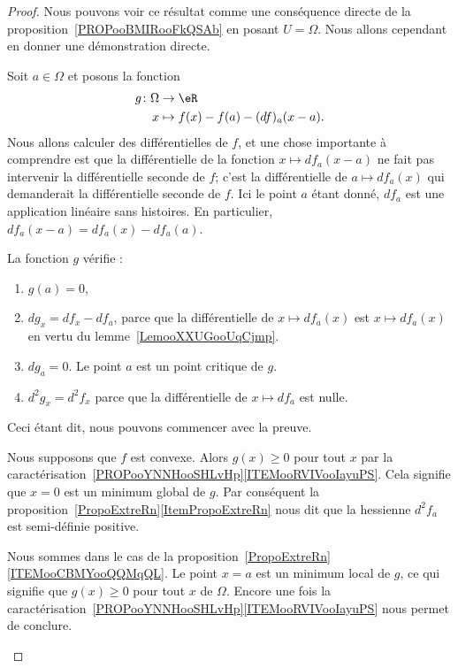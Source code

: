 \begin{proof}
	Nous pouvons voir ce résultat comme une conséquence directe de la proposition~\ref{PROPooBMIRooFkQSAb} en posant \( U=\Omega\). Nous allons cependant en donner une démonstration directe.

	Soit \( a\in \Omega\) et posons la fonction
	\begin{equation}
		\begin{aligned}
			g\colon \Omega & \to \eR                        \\
			x              & \mapsto f(x)-f(a)-(df)_a(x-a).
		\end{aligned}
	\end{equation}
	Nous allons calculer des différentielles de \( f\), et une chose importante à comprendre est que la différentielle de la fonction \( x\mapsto df_a(x-a)\) ne fait pas intervenir la différentielle seconde de \( f\); c'est la différentielle de \( a\mapsto df_a(x)\) qui demanderait la différentielle seconde de \( f\). Ici le point \( a\) étant donné, \( df_a\) est une application linéaire sans histoires. En particulier, \( df_a(x-a)=df_a(x)-df_a(a)\).

	La fonction \( g\) vérifie :
	\begin{enumerate}
		\item
		      \( g(a)=0\),
		\item
		      \( dg_x=df_x-df_a\), parce que la différentielle de \( x\mapsto df_a(x)\) est \( x\mapsto df_a(x)\) en vertu du lemme~\ref{LemooXXUGooUqCjmp}.
		\item
		      \( dg_a=0\). Le point \( a\) est un point critique de \( g\).
		\item
		      \( d^2g_x=d^2f_x\) parce que la différentielle de \( x\mapsto df_a\) est nulle.
	\end{enumerate}
	Ceci étant dit, nous pouvons commencer avec la preuve.
	\begin{subproof}

		Nous supposons que \( f\) est convexe. Alors \( g(x)\geq 0\) pour tout \( x\) par la caractérisation~\ref{PROPooYNNHooSHLvHp}\ref{ITEMooRVIVooIayuPS}. Cela signifie que \( x=0\) est un minimum global de \( g\). Par conséquent la proposition~\ref{PropoExtreRn}\ref{ItemPropoExtreRn} nous dit que la hessienne \( d^2f_a\) est semi-définie positive.


		Nous sommes dans le cas de la proposition~\ref{PropoExtreRn}\ref{ITEMooCBMYooQQMqQL}. Le point \( x=a\) est un minimum local de \( g\), ce qui signifie que \( g(x)\geq 0\) pour tout \( x\) de \( \Omega\). Encore une fois la caractérisation~\ref{PROPooYNNHooSHLvHp}\ref{ITEMooRVIVooIayuPS} nous permet de conclure.


\end{subproof}
\end{proof}
